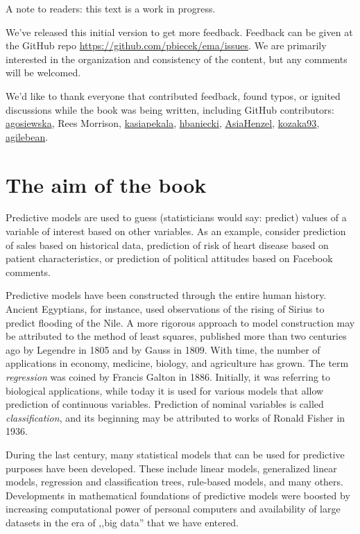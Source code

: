 \documentclass[]{krantz}
\begin{document}
A note to readers: this text is a work in progress.

We've released this initial version to get more feedback. Feedback can be given at the GitHub repo \url{https://github.com/pbiecek/ema/issues}. We are primarily interested in the organization and consistency of the content, but any comments will be welcomed.

We'd like to thank everyone that contributed feedback, found typos, or ignited discussions while the book was being written, including GitHub contributors: \href{https://github.com/agosiewska/}{agosiewska}, Rees Morrison, \href{https://github.com/kasiapekala/}{kasiapekala}, \href{https://github.com/hbaniecki/}{hbaniecki}, \href{https://github.com/AsiaHenzel/}{AsiaHenzel}, \href{https://github.com/kozaka93/}{kozaka93},
\href{https://github.com/agilebean/}{agilebean}.

\hypertarget{the-aim-of-the-book}{%
\section{The aim of the book}\label{the-aim-of-the-book}}

Predictive models are used to guess (statisticians would say: predict) values of a variable of interest based on other variables. As an example, consider prediction of sales based on historical data, prediction of risk of heart disease based on patient characteristics, or prediction of political attitudes based on Facebook comments.

Predictive models have been constructed through the entire human history. Ancient Egyptians, for instance, used observations of the rising of Sirius to predict flooding of the Nile. A more rigorous approach to model construction may be attributed to the method of least squares, published more than two centuries ago by Legendre in 1805 and by Gauss in 1809. With time, the number of applications in economy, medicine, biology, and agriculture has grown. The term \emph{regression} was coined by Francis Galton in 1886. Initially, it was referring to biological applications, while today it is used for various models that allow prediction of continuous variables. Prediction of nominal variables is called \emph{classification}, and its beginning may be attributed to works of Ronald Fisher in 1936.

During the last century, many statistical models that can be used for predictive purposes have been developed. These include linear models, generalized linear models, regression and classification trees, rule-based models, and many others. Developments in mathematical foundations of predictive models were boosted by increasing computational power of personal computers and availability of large datasets in the era of ,,big data'' that we have entered.
\end{document}
